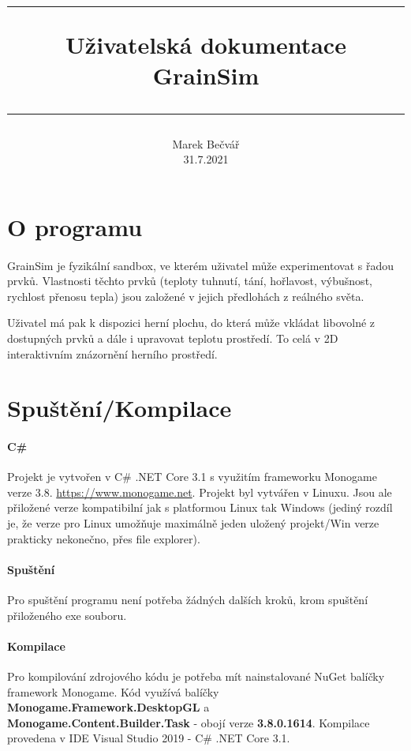 \documentclass[a4paper, 12pt]{article}
\title{
        \vspace{1in}
        \rule{\linewidth}{0.5pt}
		\usefont{OT1}{bch}{b}{n}
        \huge Uživatelská dokumentace \\GrainSim\\
        \vspace{-10pt}
        \rule{\linewidth}{1pt}
}
\author{
		\normalfont\normalsize
        Marek Bečvář\\[-3pt]\normalsize
        31.7.2021
}
\date{}
\begin{document}
\maketitle 
\newpage

\tableofcontents
\newpage

\section{O programu} 
\paragraph{}
GrainSim je fyzikální sandbox, ve kterém uživatel může experimentovat s řadou 
prvků. Vlastnosti těchto prvků (teploty tuhnutí, tání, hořlavost, výbušnost, rychlost
přenosu tepla) jsou založené v jejich předlohách z reálného světa.

Uživatel má pak k dispozici herní plochu, do která může vkládat libovolné z
dostupných prvků a dále i upravovat teplotu prostředí. To celá v 2D interaktivním 
znázornění herního prostředí.

\section{Spuštění/Kompilace}
\paragraph{C\#}
Projekt je vytvořen v C\# .NET Core 3.1 s využitím frameworku Monogame verze 3.8.
\url{https://www.monogame.net}. Projekt byl vytvářen v Linuxu. Jsou ale
přiložené verze kompatibilní jak s platformou Linux tak Windows (jediný rozdíl je, že verze
pro Linux umožňuje maximálně jeden uložený projekt/Win verze prakticky
nekonečno, přes file explorer).

\paragraph{Spuštění}
Pro spuštění programu není potřeba žádných dalších kroků, krom spuštění
přiloženého exe souboru.

\paragraph{Kompilace}
Pro kompilování zdrojového kódu je potřeba mít nainstalované NuGet balíčky framework
Monogame. Kód využívá balíčky \\\textbf{Monogame.Framework.DesktopGL} a
\\\textbf{Monogame.Content.Builder.Task} - obojí verze \textbf{3.8.0.1614}. 
Kompilace provedena v IDE Visual Studio 2019 - C\# .NET Core 3.1.
\end{document}
